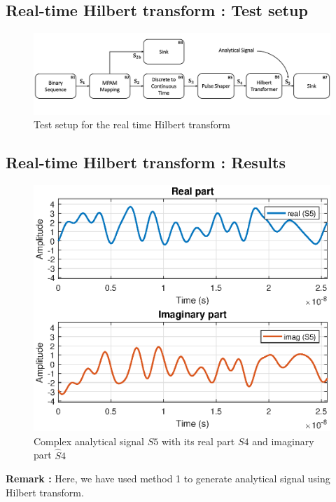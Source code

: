 \subsection*{Real-time Hilbert transform : Test setup}
\begin{figure}[h]
	\centering
	\includegraphics[width=14cm]{./algorithms/hilbert/figures/test_setup.pdf}
	\caption{Test setup for the real time Hilbert transform }\label{test_setup}
\end{figure}
\subsection*{Real-time Hilbert transform : Results}
\begin{figure}[h]
	\centering
	\includegraphics[width=13cm]{./algorithms/hilbert/figures/S5.eps}
	\caption{Complex analytical signal $S5$ with its real part $S4$ and imaginary part $\hat{S}4$}\label{S5}
\end{figure}
\textbf{Remark :} Here, we have used method 1 to generate analytical signal using Hilbert transform.




